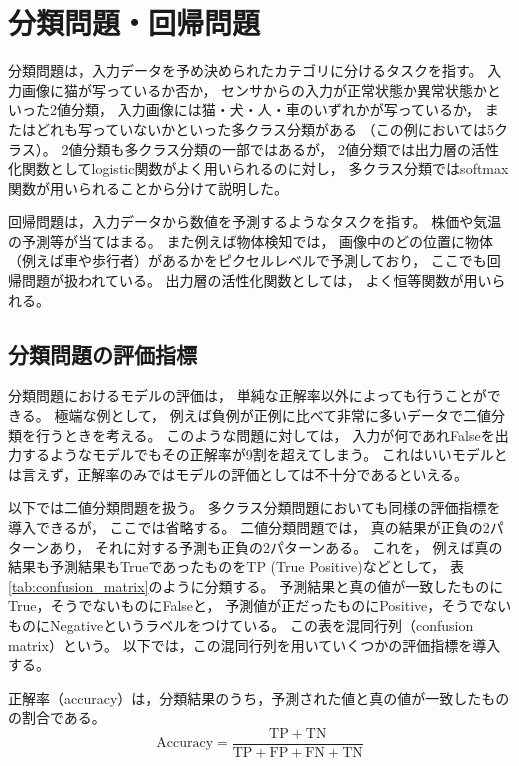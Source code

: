 \documentclass[class=jsarticle, crop=false, dvipdfmx, fleqn]{standalone}
\begin{document}
\section{分類問題・回帰問題}

分類問題は，入力データを予め決められたカテゴリに分けるタスクを指す。
入力画像に猫が写っているか否か，
センサからの入力が正常状態か異常状態かといった2値分類，
入力画像には猫・犬・人・車のいずれかが写っているか，
またはどれも写っていないかといった多クラス分類がある
（この例においては5クラス）。
2値分類も多クラス分類の一部ではあるが，
2値分類では出力層の活性化関数としてlogistic関数がよく用いられるのに対し，
多クラス分類ではsoftmax関数が用いられることから分けて説明した。

回帰問題は，入力データから数値を予測するようなタスクを指す。
株価や気温の予測等が当てはまる。
また例えば物体検知では，
画像中のどの位置に物体（例えば車や歩行者）があるかをピクセルレベルで予測しており，
ここでも回帰問題が扱われている。
出力層の活性化関数としては，
よく恒等関数が用いられる。


\subsection{分類問題の評価指標}

分類問題におけるモデルの評価は，
単純な正解率以外によっても行うことができる。
極端な例として，
例えば負例が正例に比べて非常に多いデータで二値分類を行うときを考える。
このような問題に対しては，
入力が何であれFalseを出力するようなモデルでもその正解率が9割を超えてしまう。
これはいいモデルとは言えず，正解率のみではモデルの評価としては不十分であるといえる。

以下では二値分類問題を扱う。
多クラス分類問題においても同様の評価指標を導入できるが，
ここでは省略する。
二値分類問題では，
真の結果が正負の2パターンあり，
それに対する予測も正負の2パターンある。
これを，
例えば真の結果も予測結果もTrueであったものをTP (True Positive)などとして，
表\ref{tab:confusion_matrix}のように分類する。
予測結果と真の値が一致したものにTrue，そうでないものにFalseと，
予測値が正だったものにPositive，そうでないものにNegativeというラベルをつけている。
この表を混同行列（confusion matrix）という。
以下では，この混同行列を用いていくつかの評価指標を導入する。

正解率（accuracy）は，分類結果のうち，予測された値と真の値が一致したものの割合である。
\begin{equation}
\text{Accuracy} = \frac{\mathrm{TP + TN}}{\mathrm{TP + FP + FN + TN}}
\end{equation}
\end{document}
